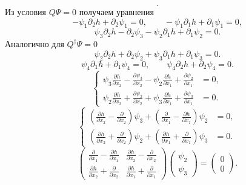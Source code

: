 \documentclass[a4paper, 14pt]{extarticle}
\begin{document}
\begin{sol}
\[.\] 
Из условия
$
Q\Psi=0
$ получаем уравнения
\[
-\psi_1 \partial_2 h +\partial_2 \psi_1=0,\qquad
-\psi_1 \partial_1 h+\partial_1 \psi_1=0
,\] 
\[
\psi_3 \partial_2 h-\partial_2 \psi_3 -
\psi_2 \partial_1  h+\partial_1 \psi_2=0
.\] 
Аналогично для $Q^\dagger \Psi =0$ 
\[
\psi_2 \partial_2 h+ \partial_2 \psi_2 +\psi_3 \partial_1 h+\partial_1 \psi_3=0
.\] 
\[
\psi_4 \partial_1 h+ \partial_1 \psi_4=0,\qquad
\psi_4 \partial_2 h+\partial_2 \psi_4=0
.\] 
\[
\left\{
\begin{aligned}
\psi_3 \frac{\partial h}{\partial x_2} -\frac{\partial \psi_3}{\partial x_2} -\psi_2 \frac{\partial h}{\partial x_1} + \frac{\partial \psi_2}{\partial x_1} &= 0, \\
\psi_2 \frac{\partial h}{\partial x_2} +
\frac{\partial \psi_2}{\partial x_2} +
\psi_3 \frac{\partial h}{\partial x_1} +
\frac{\partial \psi_3}{\partial x_1} &=0.
\end{aligned}
\right.
\] 
\[
\left\{
\begin{aligned}
	\left( \frac{\partial h}{\partial x_2} -\frac{\partial }{\partial x_2}  \right) \psi_3+
\left( \frac{\partial }{\partial x_1} -\frac{\partial h}{\partial x_1}  \right) \psi_2&= 0, \\
\left( \frac{\partial h}{\partial x_2} +\frac{\partial }{\partial x_2}  \right) \psi_2+
\left( \frac{\partial h}{\partial x_1} +\frac{\partial }{\partial x_1}  \right) \psi_3&=0.
\end{aligned}
\right.
\] 
\[
	\begin{pmatrix}\frac{\partial }{\partial x_1} -\frac{\partial h}{\partial x_1} &
	\frac{\partial h}{\partial x_2} -\frac{\partial }{\partial x_2} \\
\frac{\partial h}{\partial x_2} +\frac{\partial }{\partial x_2} & \frac{\partial h}{\partial x_1} +\frac{\partial }{\partial x_1} \end{pmatrix} \begin{pmatrix} 
\psi_2 \\ \psi_3\end{pmatrix} =\begin{pmatrix} 0\\0 \end{pmatrix} 
.\] 
\end{sol}
\begin{hiProb}
\end{hiProb}
\end{document}

